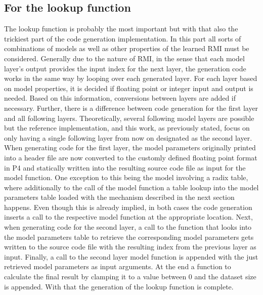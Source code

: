 \subsection{For the lookup function}
\label{sect:rmiforp4:lookup}
The lookup function is probably the most important but with that also the trickiest part of the code generation implementation. In this part all sorts of combinations of models as well as other properties of the learned RMI must be considered. Generally due to the nature of RMI, in the sense that each model layer's output provides the input index for the next layer, the generation code works in the same way by looping over each generated layer. For each layer based on model properties, it is decided if floating point or integer input and output is needed. Based on this information, conversions between layers are added if necessary. Further, there is a difference between code generation for the first layer and all following layers. Theoretically, several following model layers are possible but the reference implementation, and this work, as previously stated, focus on only having a single following layer from now on designated as the second layer. When generating code for the first layer, the model parameters originally printed into a header file are now converted to the customly defined floating point format in P4 and statically written into the resulting source code file as input for the model function. One exception to this being the model involving a radix table, where additionally to the call of the model function a table lookup into the model parameters table loaded with the mechanism described in the next section happens. Even though this is already implied, in both cases the code generation inserts a call to the respective model function at the appropriate location. Next, when generating code for the second layer, a call to the function that looks into the model parameters table to retrieve the corresponding model parameters gets written to the source code file with the resulting index from the previous layer as input. Finally, a call to the second layer model function is appended with the just retrieved model parameters as input arguments. At the end a function to calculate the final result by clamping it to a value between 0 and the dataset size is appended. With that the generation of the lookup function is complete.

